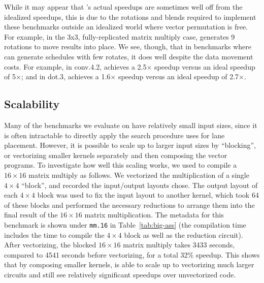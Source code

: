 While it may appear that \system's actual speedups are sometimes well off from the idealized speedups, this is due to the rotations and blends required to implement these benchmarks outside an idealized world where vector permutation is free. For example, in the \textsf{3x3}, fully-replicated matrix multiply case, \system generates 9 rotations to move results into place. We see, though, that in benchmarks where \system can generate schedules with few rotates, it does well despite the data movement costs. For example, in \textsf{conv.4.2}, \system achieves a 2.5$\times$ speedup versus an ideal speedup of 5$\times$; and in \textsf{dot.3}, \system achieves a 1.6$\times$ speedup versus an ideal speedup of 2.7$\times$.

\subsection{Scalability}\label{sec:scalability}
Many of the benchmarks we evaluate on have relatively small input sizes, since it is often intractable to directly apply the search procedure \system uses for lane placement.
However, it is possible to scale \system up to larger input sizes by ``blocking'', or vectorizing smaller kernels separately and then composing the vector programs.
To investigate how well this scaling works, we used \system to compile a $16\times 16$ matrix multiply as follows.
We vectorized the multiplication of a single $4\times 4$ ``block'', and recorded the input/output layouts \system chose.
The output layout of each $4\times 4$ block was used to fix the input layout to another kernel, which took 64 of these blocks and performed the necessary reductions to arrange them into the final result of the $16\times 16$ matrix multiplication.
The metadata for this benchmark is shown under {\tt mm.16} in Table~\ref{tab:big-ass} (the compilation time includes the time to compile the $4\times 4$ block as well as the reduction circuit).
After vectorizing, the blocked $16\times 16$ matrix multiply takes 3433 seconds, compared to 4541 seconds before vectorizing, for a total 32\% speedup.
This shows that by composing smaller kernels, \system is able to scale up to vectorizing much larger circuits and still see relatively significant speedups over unvectorized code. 

